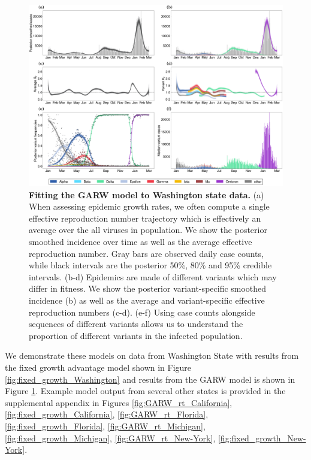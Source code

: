 \documentclass[11pt,oneside,letterpaper]{article}
\def\tbc#1{\textcolor{purple}{[#1]}}
\begin{document}
\begin{figure}[h!]
  \centering
  \includegraphics[width=\linewidth]{figs/GARW_rt_Washington.png}
  \caption{\textbf{Fitting the GARW model to Washington state data.}
    (a) When assessing epidemic growth rates, we often compute a single effective reproduction number trajectory which is effectively an average over the all viruses in population. We show the posterior smoothed incidence over time as well as the average effective reproduction number.
    Gray bars are observed daily case counts, while black intervals are the posterior 50\%, 80\% and 95\% credible intervals.
    (b-d) Epidemics are made of different variants which may differ in fitness. 
    We show the posterior variant-specific smoothed incidence (b) as well as the average and variant-specific effective reproduction numbers (c-d).
    (e-f) Using case counts alongside sequences of different variants allows us to understand the proportion of different variants in the infected population.
    }
  \label{fig:GARW_rt_Washington}
\end{figure}

We demonstrate these models on data from Washington State with results from the fixed growth advantage model shown in Figure \ref{fig:fixed_growth_Washington} and results from the GARW model is shown in Figure \ref{fig:GARW_rt_Washington}.
Example model output from several other states is provided in the supplemental appendix in Figures \ref{fig:GARW_rt_California}, \ref{fig:fixed_growth_California}, \ref{fig:GARW_rt_Florida}, \ref{fig:fixed_growth_Florida}, \ref{fig:GARW_rt_Michigan}, \ref{fig:fixed_growth_Michigan}, \ref{fig:GARW_rt_New-York}, \ref{fig:fixed_growth_New-York}.
\end{document}
